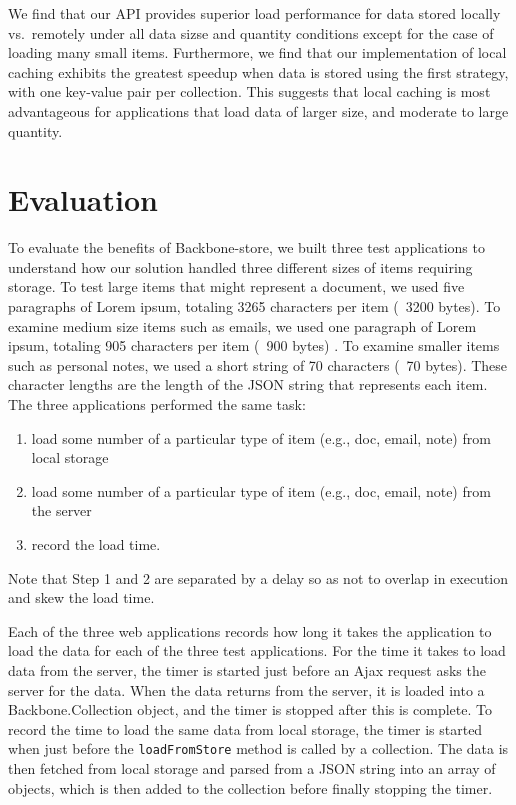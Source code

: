 \documentclass[12pt]{article}
\begin{document}
We find that our API provides superior load performance for data
stored locally vs.\ remotely under all data sizse and quantity conditions except
for the case of loading many small items. Furthermore, we find that our
implementation of local caching exhibits the greatest speedup when data is
stored using the first strategy, with one key-value pair per collection. This
suggests that local caching is most advantageous for applications that load
data of larger size, and moderate to large quantity.

\section{Evaluation}

To evaluate the benefits of Backbone-store, we built three test applications to
understand how our solution handled three different sizes of items requiring
storage. To test large items that might represent a document, we used five
paragraphs of Lorem ipsum, totaling 3265 characters per item (~3200 bytes). To examine
medium size items such as emails, we used one paragraph of Lorem ipsum,
totaling 905 characters per item (~900 bytes) . To examine smaller items such as personal
notes, we used a short string of 70 characters (~70 bytes). These character lengths are the
length of the JSON string that represents each item. The three applications
performed the same task: 
\begin{enumerate}
\item load some number of a particular type of item (e.g., doc, email, note) from
local storage
\item load some number of a particular type of item (e.g., doc, email, note) from the server
\item record the load time.
\end{enumerate}

Note that Step 1 and 2 are separated by a delay so as not to overlap in
execution and skew the load time.

Each of the three web applications records how long it takes the application to
load the data for each of the three test applications. For the time it takes to
load data from the server, the timer is started just before an Ajax request
asks the server for the data. When the data returns from the server, it is
loaded into a Backbone.Collection object, and the timer is stopped after this
is complete. To record the time to load the same data from local storage, the
timer is started when just before the \verb=loadFromStore= method is called by
a collection. The data is then fetched from local storage and parsed from a JSON
string into an array of objects, which is then added to the collection before
finally stopping the timer.
\end{document}

